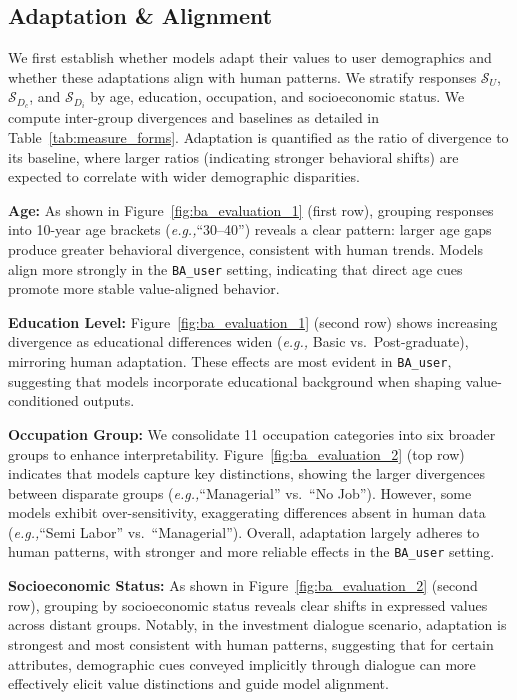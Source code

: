 \documentclass[acmlarge]{acmart}
\newcommand{\paratitle}[1]{\par\smallskip\noindent\textbf{#1}}
\newcommand{\eg}{\textit{e.g.,}\xspace}
\begin{document}
\subsection{Adaptation \& Alignment}

We first establish whether models adapt their values to user demographics and whether these adaptations align with human patterns. We stratify responses $\mathcal{S}_U$, $\mathcal{S}_{D_c}$, and $\mathcal{S}_{D_i}$ by age, education, occupation, and socioeconomic status. We compute inter-group divergences and baselines as detailed in Table~\ref{tab:measure_forms}. Adaptation is quantified as the ratio of divergence to its baseline, where larger ratios (indicating stronger behavioral shifts) are expected to correlate with wider demographic disparities.

\paratitle{Age:} As shown in Figure~\ref{fig:ba_evaluation_1} (first row), grouping responses into 10-year age brackets (\eg ``30--40'') reveals a clear pattern: larger age gaps produce greater behavioral divergence, consistent with human trends. Models align more strongly in the \texttt{BA\_user} setting, indicating that direct age cues promote more stable value-aligned behavior.

\paratitle{Education Level:} Figure~\ref{fig:ba_evaluation_1} (second row) shows increasing divergence as educational differences widen (\eg Basic vs.\ Post-graduate), mirroring human adaptation. These effects are most evident in \texttt{BA\_user}, suggesting that models incorporate educational background when shaping value-conditioned outputs.

\paratitle{Occupation Group:} We consolidate 11 occupation categories into six broader groups to enhance interpretability. Figure~\ref{fig:ba_evaluation_2} (top row) indicates that models capture key distinctions, showing the larger divergences between disparate groups (\eg ``Managerial'' vs.\ ``No Job''). However, some models exhibit over-sensitivity, exaggerating differences absent in human data (\eg ``Semi Labor'' vs.\ ``Managerial''). Overall, adaptation largely adheres to human patterns, with stronger and more reliable effects in the \texttt{BA\_user} setting.

\paratitle{Socioeconomic Status:} As shown in Figure~\ref{fig:ba_evaluation_2} (second row), grouping by socioeconomic status reveals clear shifts in expressed values across distant groups. Notably, in the investment dialogue scenario, adaptation is strongest and most consistent with human patterns, suggesting that for certain attributes, demographic cues conveyed implicitly through dialogue can more effectively elicit value distinctions and guide model alignment.
\end{document}
